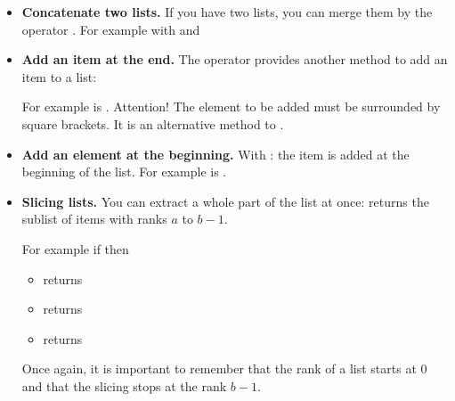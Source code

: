\documentclass[11pt,class=report,crop=false]{standalone}
\begin{document}
\begin{cours}[List (3)]
\sauteligne
\begin{itemize}
  \item \textbf{Concatenate two  lists.} If you have two lists, you can merge them by the operator \og{}\ci{+}\fg{}. For example with 
   and  
  
    
  \item \textbf{Add an item at the end.} The operator \og{}\ci{+}\fg{} provides another method to add an item to a list: 
  
  For example \ci{[1,2,3,4] + [5]} is \ci{[1,2,3,4,5]}.
  Attention! The element to be added must be surrounded by square brackets.   
  It is an alternative method to .
  
  \item \textbf{Add an element at the beginning.} With : 
  the item is added at the beginning of the list.
  For example \ci{[5] + [1,2,3,4]} is \ci{[5,1,2,3,4]}. 
  
  \item \textbf{Slicing lists.} You can extract a whole part of the list at once:  returns the sublist of items with ranks $a$ to $b-1$.
  
  \smallskip
  
  
    For example if  then  
  \begin{itemize}
    \item {} returns \ci{["B","C","D"]}
    \item {} returns \ci{["A","B"]}
    \item {} returns \ci{["E","F","G"]}
  \end{itemize} 
  Once again, it is important to remember that the rank of a list starts at $0$ and that the slicing  stops at the rank $b-1$.
   
\end{itemize}
\end{cours}

\end{document}
